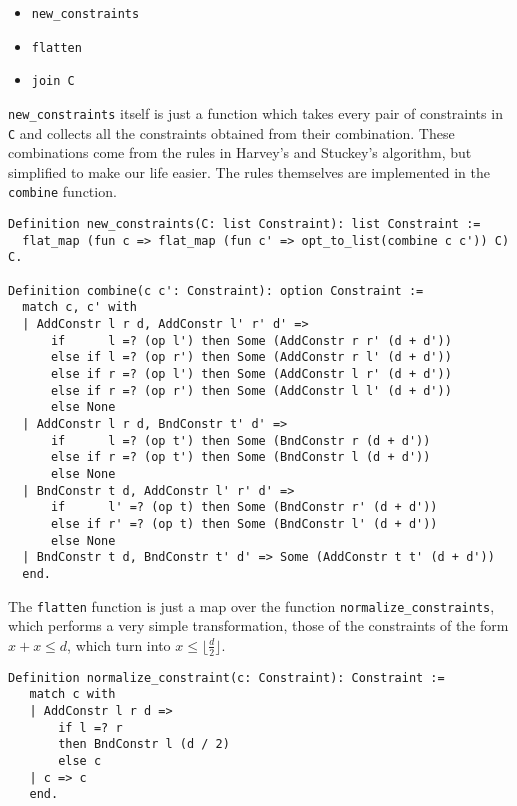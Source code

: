 \begin{itemize}
    \item \texttt{new_constraints}
    \item \texttt{flatten}
    \item \texttt{join C}
\end{itemize}

\texttt{new_constraints} itself is just a function which takes every pair of constraints in 
\texttt{C} and collects all the constraints obtained from their combination.
These combinations come from the rules in Harvey's and Stuckey's algorithm, but 
simplified to make our life easier. The rules themselves are implemented in the 
\texttt{combine} function.

\begin{verbatim}
Definition new_constraints(C: list Constraint): list Constraint :=
  flat_map (fun c => flat_map (fun c' => opt_to_list(combine c c')) C) C.
  
Definition combine(c c': Constraint): option Constraint :=
  match c, c' with
  | AddConstr l r d, AddConstr l' r' d' =>
      if      l =? (op l') then Some (AddConstr r r' (d + d'))
      else if l =? (op r') then Some (AddConstr r l' (d + d'))
      else if r =? (op l') then Some (AddConstr l r' (d + d'))
      else if r =? (op r') then Some (AddConstr l l' (d + d'))
      else None
  | AddConstr l r d, BndConstr t' d' =>
      if      l =? (op t') then Some (BndConstr r (d + d'))
      else if r =? (op t') then Some (BndConstr l (d + d'))
      else None
  | BndConstr t d, AddConstr l' r' d' =>
      if      l' =? (op t) then Some (BndConstr r' (d + d'))
      else if r' =? (op t) then Some (BndConstr l' (d + d'))
      else None
  | BndConstr t d, BndConstr t' d' => Some (AddConstr t t' (d + d'))
  end.
\end{verbatim}

The \texttt{flatten} function is just a map over the function 
\texttt{normalize_constraints}, which performs a very simple transformation, those of 
the constraints of the form $x + x \le d$, which turn into $x \le \lfloor \frac{d}{2}\rfloor$.

\begin{verbatim}
Definition normalize_constraint(c: Constraint): Constraint :=
   match c with
   | AddConstr l r d => 
       if l =? r 
       then BndConstr l (d / 2)
       else c
   | c => c
   end.
\end{verbatim}

